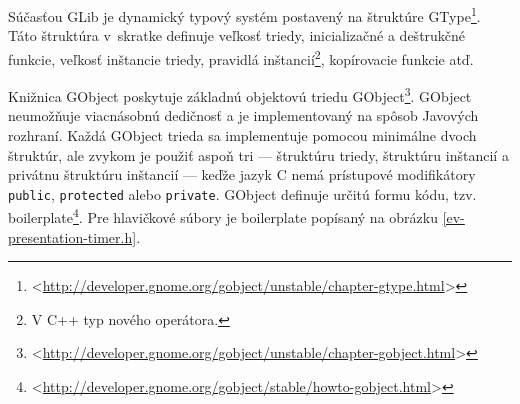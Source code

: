 \documentclass[12pt,oneside,final]{fithesis2}
\begin{document}
Súčasťou GLib je dynamický typový systém postavený na štruktúre GType\footnote{<\url{http://developer.gnome.org/gobject/unstable/chapter-gtype.html}>}. Táto štruktúra v~skratke definuje veľkosť triedy, inicializačné a deštrukčné funkcie, veľkosť inštancie triedy, pravidlá inštancií\footnote{V C++ typ nového operátora.}, kopírovacie funkcie atď.

Knižnica GObject poskytuje základnú objektovú triedu GObject\footnote{<\url{http://developer.gnome.org/gobject/unstable/chapter-gobject.html}>}. GObject neumožňuje viacnásobnú dedičnosť a je implementovaný na spôsob Javových rozhraní. Každá GObject trieda sa implementuje pomocou minimálne dvoch štruktúr, ale zvykom je použiť aspoň tri --- štruktúru triedy, štruktúru inštancií a privátnu štruktúru inštancií --- keďže jazyk C nemá prístupové modifikátory \texttt{public}, \texttt{protected} alebo \texttt{private}. GObject definuje určitú formu kódu, tzv. boilerplate\footnote{<\url{http://developer.gnome.org/gobject/stable/howto-gobject.html}>}.
Pre hlavičkové súbory je boilerplate popísaný na obrázku \ref{ev-presentation-timer.h}.
\end{document}
